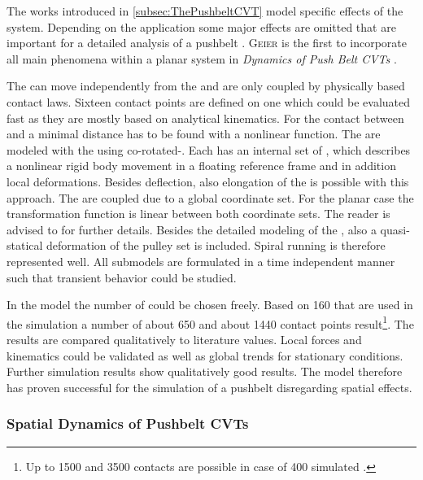 The works introduced in \cref{subsec:ThePushbeltCVT} model specific effects of the \CVT system. 
Depending on the application some major effects are omitted that are important for a detailed analysis of a pushbelt \CVT. 
\textsc{Geier} is the first to incorporate all main phenomena within a planar system in \emph{Dynamics of Push Belt CVTs} \cite{geier_dynamics_2007}.\par

The \els can move independently from the \rings and are only coupled by physically based contact laws.
Sixteen contact points are defined on one \el which could be evaluated fast as they are mostly based on analytical kinematics.
For the contact between \el and \ring a minimal distance has to be found with a nonlinear function.
The \rings are modeled with the \RCM using co-rotated-\FEs. 
Each \FE has an internal set of \DOFs, which describes a nonlinear rigid body movement in a floating reference frame and in addition local deformations. 
Besides deflection, also elongation of the \rings is possible with this approach.
The \FEs are coupled due to a global coordinate set. 
For the planar case the transformation function is linear between both coordinate sets.
The reader is advised to \cite{zander_flexible_2009} for further details.
Besides the detailed modeling of the \rings, also a quasi-statical deformation of the pulley set is included.
Spiral running is therefore represented well.
All submodels are formulated in a time independent manner such that transient behavior could be studied.\par

In the model the number of \els could be chosen freely. 
Based on 160 \els that are used in the simulation a number of about 650 %
\DOFs and about 1440 %
contact points result\footnote{Up to 1500 \DOFs and 3500 contacts are possible in case of 400 simulated \els \cite[p.81]{geier_dynamics_2007}.}.
The results are compared qualitatively to literature values. %
Local forces and kinematics could be validated as well as global trends for stationary conditions.
Further simulation results show qualitatively good results.
The model therefore has proven successful for the simulation of a pushbelt \CVT disregarding spatial effects.

\subsubsection{Spatial Dynamics of Pushbelt CVTs}
\label{subsub:SpatialDynamicsOfPushbeltCVTs}

